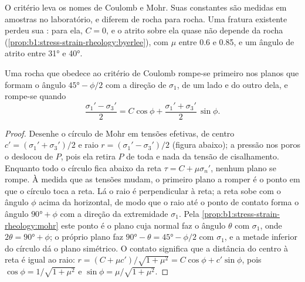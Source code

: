 O critério leva os nomes de Coulomb e Mohr. Suas constantes são medidas em amostras no laboratório, e diferem de rocha para rocha. Uma fratura existente perdeu sua : para ela, $C = 0$, e o atrito sobre ela quase não depende da rocha (\cref{prop:b1:stress-strain-rheology:byerlee}), com $\mu$ entre 0.6 e 0.85, e um ângulo de atrito entre \ang{31} e \ang{40}.

\begin{theorem}\label{thm:b1:stress-strain-rheology:failure-angle}
Uma rocha que obedece ao critério de Coulomb rompe-se primeiro nos planos que formam o ângulo $\ang{45} - \phi/2$ com a direção de $\sigma_1$, de um lado e do outro dela, e rompe-se quando
\[
  \frac{\sigma_1' - \sigma_3'}{2} = C\cos\phi + \frac{\sigma_1' + \sigma_3'}{2}\,\sin\phi .
\]
\end{theorem}

\begin{proof}
Desenhe o círculo de Mohr em tensões efetivas, de centro $c' =
(\sigma_1'+\sigma_3')/2$ e raio $r = (\sigma_1'-\sigma_3')/2$
(figura abaixo); a pressão nos poros o deslocou de $P$, pois ela retira $P$ de toda  e nada da tensão de cisalhamento.
Enquanto todo o círculo fica abaixo da reta $\tau = C + \mu\sigma_n'$, nenhum plano se rompe. À medida que as tensões mudam, o primeiro plano a romper é o ponto em que o círculo toca a reta.
Lá o raio é perpendicular à reta; a reta sobe com o ângulo $\phi$ acima da horizontal, de modo que o raio até o ponto de contato forma o ângulo $\ang{90} + \phi$ com a direção da extremidade $\sigma_1$. Pela
\cref{prop:b1:stress-strain-rheology:mohr} este ponto é o plano cuja normal faz o ângulo $\theta$ com $\sigma_1$,
onde $2\theta = \ang{90} + \phi$; o próprio plano faz $\ang{90} - \theta = \ang{45} - \phi/2$ com $\sigma_1$, e a metade inferior do círculo dá o plano simétrico. O contato significa que a distância do centro à reta é igual ao raio:
$r = (C + \mu c')/\sqrt{1+\mu^2} = C\cos\phi + c'\sin\phi$, pois
$\cos\phi = 1/\sqrt{1+\mu^2}$ e $\sin\phi = \mu/\sqrt{1+\mu^2}$.
\end{proof}

